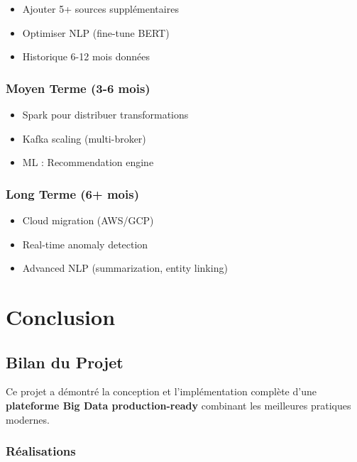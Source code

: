\documentclass[12pt,a4paper]{report}
\begin{document}
\begin{itemize}
    \item Ajouter 5+ sources supplémentaires
    \item Optimiser NLP (fine-tune BERT)
    \item Historique 6-12 mois données
\end{itemize}

\subsection{Moyen Terme (3-6 mois)}

\begin{itemize}
    \item Spark pour distribuer transformations
    \item Kafka scaling (multi-broker)
    \item ML : Recommendation engine
\end{itemize}

\subsection{Long Terme (6+ mois)}

\begin{itemize}
    \item Cloud migration (AWS/GCP)
    \item Real-time anomaly detection
    \item Advanced NLP (summarization, entity linking)
\end{itemize}


\chapter{Conclusion}

\section{Bilan du Projet}

Ce projet a démontré la conception et l'implémentation complète d'une \textbf{plateforme Big Data production-ready} combinant les meilleures pratiques modernes.

\subsection{Réalisations}
\end{document}
